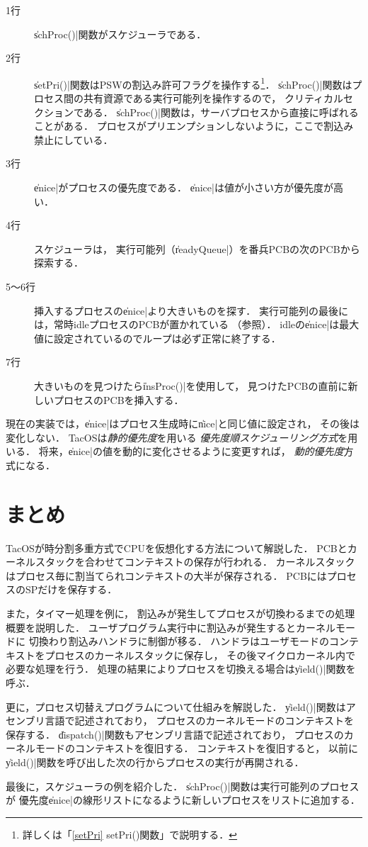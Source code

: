 

\begin{description}
\item[1行] \|schProc()|関数がスケジューラである．
\item[2行] \|setPri()|関数はPSWの割込み許可フラグを操作する\footnote{
  詳しくは「\ref{setPri} setPri()関数」で説明する．}．
  \|schProc()|関数はプロセス間の共有資源である実行可能列を操作するので，
  クリティカルセクションである．
  \|schProc()|関数は，サーバプロセスから直接に呼ばれることがある．
  プロセスがプリエンプションしないように，ここで割込み禁止にしている．
\item[3行] \|enice|がプロセスの優先度である．
  \|enice|は値が小さい方が優先度が高い．
\item[4行] スケジューラは，
  実行可能列（\|readyQueue|）を番兵PCBの次のPCBから探索する．
\item[5〜6行] 挿入するプロセスの\|enice|より大きいものを探す．
  実行可能列の最後には，常時idleプロセスのPCBが置かれている
  （参照）．
  idleの\|enice|は最大値に設定されているのでループは必ず正常に終了する．
\item[7行] 大きいものを見つけたら\|insProc()|を使用して，
  見つけたPCBの直前に新しいプロセスのPCBを挿入する．
\end{description}

現在の実装では，\|enice|はプロセス生成時に\|nice|と同じ値に設定され，
その後は変化しない．
TacOSは\emph{静的優先度}を用いる
\emph{優先度順スケジューリング方式}を用いる．
将来，\|enice|の値を動的に変化させるように変更すれば，
\emph{動的優先度}方式になる．

\section{まとめ}
TacOSが時分割多重方式でCPUを仮想化する方法について解説した．
PCBとカーネルスタックを合わせてコンテキストの保存が行われる．
カーネルスタックはプロセス毎に割当てられコンテキストの大半が保存される．
PCBにはプロセスのSPだけを保存する．

また，タイマー処理を例に，
割込みが発生してプロセスが切換わるまでの処理概要を説明した．
ユーザプログラム実行中に割込みが発生するとカーネルモードに
切換わり割込みハンドラに制御が移る．
ハンドラはユーザモードのコンテキストをプロセスのカーネルスタックに保存し，
その後マイクロカーネル内で必要な処理を行う．
処理の結果によりプロセスを切換える場合は\|yield()|関数を呼ぶ．

更に，プロセス切替えプログラムについて仕組みを解説した．
\|yield()|関数はアセンブリ言語で記述されており，
プロセスのカーネルモードのコンテキストを保存する．
\|dispatch()|関数もアセンブリ言語で記述されており，
プロセスのカーネルモードのコンテキストを復旧する．
コンテキストを復旧すると，
以前に\|yield()|関数を呼び出した次の行からプロセスの実行が再開される．

最後に，スケジューラの例を紹介した．
\|schProc()|関数は実行可能列のプロセスが
優先度\|enice|の線形リストになるように新しいプロセスをリストに追加する．
